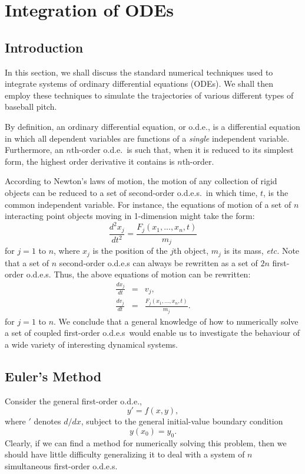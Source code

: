 \chapter{Integration of ODEs}\label{ode}
\section{Introduction}
In this section, we shall  discuss the standard numerical techniques
used to integrate systems of ordinary differential equations (ODEs). We shall then employ these
techniques to simulate the trajectories of various different types
of baseball pitch.

By definition, an ordinary differential equation, or o.d.e., is a differential
equation in which all dependent variables are functions of a {\em single}\/ independent variable. 
Furthermore, an $n$th-order o.d.e.\ is such that, when it is reduced to its simplest
form, the highest order derivative it contains is $n$th-order.

 According
to Newton's laws of motion, the motion of any collection of rigid objects can
be reduced to a set of second-order o.d.e.s.\ in which  time, $t$, is the common independent
variable. For instance, the equations of motion of a set of $n$ interacting point
objects moving in 1-dimension might take the form:
\begin{equation}
\frac{d^2 x_j}{dt^2} = \frac{F_j(x_1,...,x_n,t)}{m_j}
\end{equation}
for $j=1$ to $n$, where $x_j$ is the position of the $j$th object, $m_j$ is
its mass, {\em etc.} Note that a set of $n$ second-order o.d.e.s can
always be rewritten as a set of $2n$ first-order o.d.e.s. Thus, the above
equations of motion can be rewritten:
\begin{eqnarray}
\frac{dx_j}{dt} &=& v_j,\\[0.5ex]
\frac{dv_j}{dt} &=& \frac{F_j(x_1,...,x_n,t)}{m_j}.
\end{eqnarray}
for $j=1$ to $n$. We conclude that a general knowledge of how to numerically solve a set of
coupled first-order o.d.e.s\ would enable us to investigate the behaviour of
a wide variety of interesting dynamical systems.

\section{Euler's Method}
Consider the general first-order o.d.e.,
\begin{equation}
y' = f(x,y),\label{e1.19}
\end{equation}
where $'$ denotes $d/dx$, subject to the general initial-value boundary
condition
\begin{equation}
y(x_0) = y_0.
\end{equation}
Clearly, if we can find a  method for numerically solving this problem, then we should
have little difficulty  generalizing it to
deal with a system of $n$ simultaneous first-order o.d.e.s.

